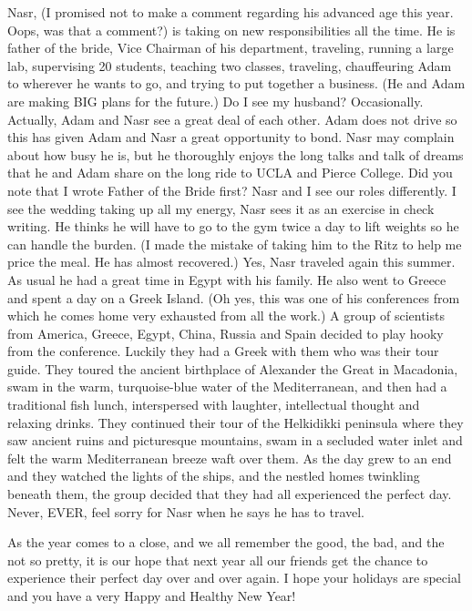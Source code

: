 Nasr, (I promised not to make a comment regarding his advanced age this year. Oops, was that a comment?) is taking on new responsibilities all
the time.  He is father of the bride, Vice Chairman of his department, traveling, running a large lab, supervising 20 students, teaching two
classes, traveling, chauffeuring Adam to wherever he wants to go, and trying to put together a business. (He and Adam are making BIG plans for
the future.)  Do I see my husband?  Occasionally.  Actually, Adam and Nasr see a great deal of each other.  Adam does not drive so this has
given Adam and Nasr a great opportunity to bond.  Nasr may complain about how busy he is, but he thoroughly enjoys the long talks and talk of
dreams that he and Adam share on the long ride to UCLA and Pierce College.  Did you note that I wrote Father of the Bride first?  Nasr and I see
our roles differently.  I see the wedding taking up all my energy, Nasr sees it as an exercise in check writing. He thinks he will have to go to
the gym twice a day to lift weights so he can handle the burden. (I made the mistake of taking him to the Ritz to help me price the meal.  He
has almost recovered.)   Yes, Nasr traveled again this summer.  As usual he had a great time in Egypt with his family.  He also went to Greece
and spent a day on a Greek Island.  (Oh yes, this was one of his conferences from which he comes home very exhausted from all the work.) A group
of scientists from America, Greece, Egypt, China, Russia and Spain decided to play hooky from the conference.  Luckily they had a Greek with
them who was their tour guide.  They toured the ancient birthplace of Alexander the Great in Macadonia, swam in the warm, turquoise-blue water
of the Mediterranean, and then had a traditional fish lunch, interspersed with laughter, intellectual thought and relaxing drinks.  They
continued their tour of the Helkidikki peninsula where they saw ancient ruins and picturesque mountains, swam in a secluded water inlet and felt
the warm Mediterranean breeze waft over them.  As the day grew to an end and they watched the lights of the ships, and the nestled homes
twinkling beneath them, the group decided that they had all experienced the perfect day.   Never, EVER, feel sorry for Nasr when he says he has
to travel.

As the year comes to a close, and we all remember the good, the bad, and the not so pretty, it is our hope that next year all our friends get
the chance to experience their perfect day over and over again.  I hope your holidays are special and you have a very Happy and Healthy New
Year!

